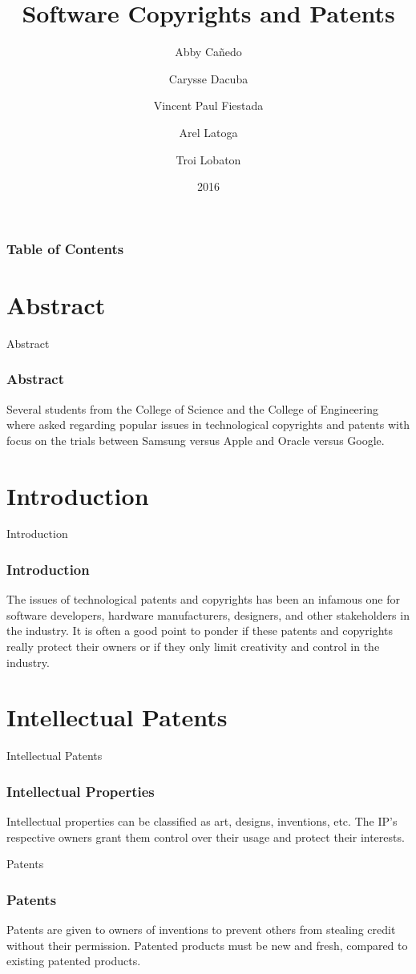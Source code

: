 \documentclass{beamer}
\title{Software Copyrights and Patents}
\author[Ca\~{n}edo, Dacuba, Fiestada, Latoga, Lobaton]
{Abby Ca\~{n}edo \and Carysse Dacuba \and Vincent Paul Fiestada \and Arel Latoga \and Troi Lobaton}
\institute{University of the Philippines Diliman}
\date{2016}
\begin{document}
\frame{\titlepage}

\begin{frame}
	\frametitle{Table of Contents}
	\tableofcontents
\end{frame}

\section{Abstract}
\begin{frame}{Abstract}
\frametitle{Abstract}
	Several students from the College of Science and the College of Engineering \pause
	where asked regarding popular issues in technological copyrights and patents \pause
	with focus on the trials between Samsung versus Apple and Oracle versus Google.
\end{frame}

\section{Introduction}
\begin{frame}{Introduction}
\frametitle{Introduction}
	The issues of technological patents and copyrights has been an infamous one for \pause
	software developers, hardware manufacturers, designers, and other stakeholders in the industry. \pause
	It is often a good point to ponder if these patents and copyrights really protect their owners \pause
	or if they only limit creativity and control in the industry.
\end{frame}

\section{Intellectual Patents}
\begin{frame}{Intellectual Patents}
\frametitle{Intellectual Properties}
	Intellectual properties can be classified as art, designs, inventions, etc. \pause
	The IP's respective owners grant them control over their usage and protect their interests. 
\end{frame}
\begin{frame}{Patents}
\frametitle{Patents}
	Patents are given to owners of inventions to prevent others from stealing credit without their permission. \pause
	Patented products must be new and fresh, compared to existing patented products.
\end{frame}
\end{document}
